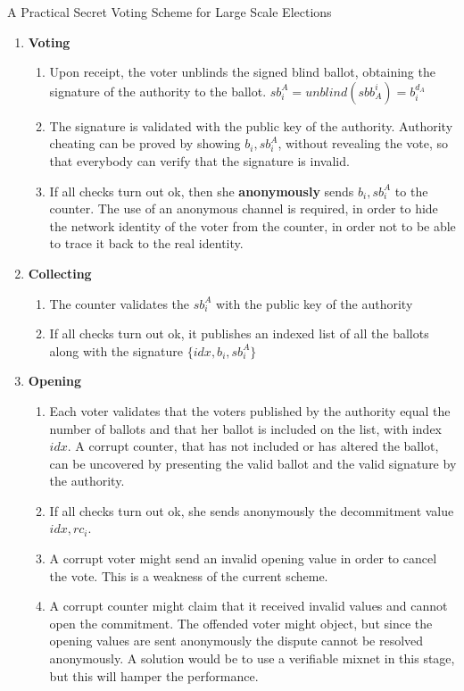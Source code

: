 \documentclass{beamer}
\begin{document}
\begin{frame}[allowframebreaks]{A Practical Secret Voting Scheme for Large Scale Elections \cite{FOO92}}
\begin{enumerate}
\item \textbf{Voting}
\begin{enumerate}
\item Upon receipt, the voter unblinds the signed blind ballot, obtaining the signature of the authority to the ballot. $sb_i^A = unblind(sbb^i_A)=b_i^{d_A}$
\item The signature is validated with the public key of the authority. Authority cheating can be proved by showing $b_i, sb_i^A$, without revealing the vote, so that everybody can verify that the signature is invalid.
\item If all checks turn out ok, then she \textbf{anonymously} sends $b_i,sb_i^A$ to the counter. The use of an anonymous channel is required, in order to hide the network identity of the voter from the counter, in order not to be able to trace it back to the real identity.
\end{enumerate}
\item \textbf{Collecting}
\begin{enumerate}
\item The counter validates the $sb_i^A$ with the public key of the authority
\item If all checks turn out ok, it publishes an indexed list of all the ballots along with the signature $\{ idx, b_i, sb_i^A \}$
\end{enumerate}
\item \textbf{Opening}
\begin{enumerate}
\item Each voter validates that the voters published by the authority equal the number of ballots and that her ballot is included on the list, with index $idx$. A corrupt counter, that has not included or has altered the ballot, can be uncovered by presenting the valid ballot and the valid signature by the authority.
\item If all checks turn out ok, she sends anonymously the decommitment value $idx,rc_i$.
\item A corrupt voter might send an invalid opening value in order to cancel the vote. This is a weakness of the current scheme. 
\item A corrupt counter might claim that it received invalid values and cannot open the commitment. The offended voter might object, but since the opening values are sent anonymously the dispute cannot be resolved anonymously. A solution would be to use a verifiable mixnet in this stage, but this will hamper the performance.
\end{enumerate}

\end{enumerate}
\end{frame}
\end{document}
